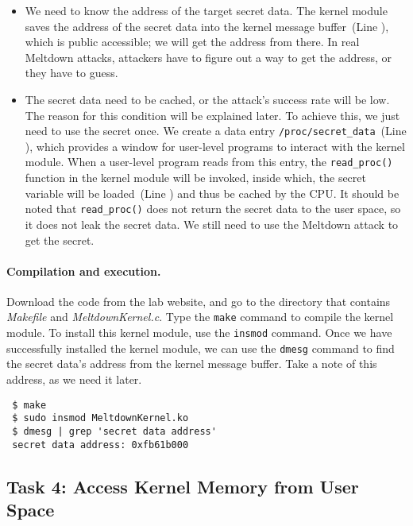 \begin{itemize}
\item We need to know the address of the target secret data. 
The kernel module saves the address of the secret data into the kernel message buffer~(Line
), which is public accessible; we will get the address from there. In real Meltdown
attacks, attackers have to figure out a way to get the address, or they have to guess.


\item The secret data need to be cached, or the attack's success rate will be low. 
The reason for this condition will be explained later. To achieve this, we just need to use the secret once. 
We create a data entry \texttt{/proc/secret\_data}~(Line ), which provides a window
for user-level programs to interact with the kernel module. When a user-level program reads
from this entry, the \texttt{read\_proc()} function in the kernel module will be invoked,
inside which, the secret variable will be loaded~(Line ) and thus be cached by the CPU. 
It should be noted that \texttt{read\_proc()} does not return
the secret data to the user space, so it does not leak the secret data. We still need
to use the Meltdown attack to get the secret.
\end{itemize}


\paragraph{Compilation and execution.}
Download the code from the lab website, and go to the directory that contains 
\textit{Makefile} and \textit{MeltdownKernel.c}. Type the \texttt{make} command
to compile the kernel module. 
To install this kernel module, use the \texttt{insmod} command. 
Once we have successfully installed the kernel module, we can 
use the \texttt{dmesg} command to find the 
secret data's address from the kernel message buffer. Take a note of this address, as we need
it later.

\begin{lstlisting}
 $ make
 $ sudo insmod MeltdownKernel.ko
 $ dmesg | grep 'secret data address'
 secret data address: 0xfb61b000
\end{lstlisting}
 



\subsection{Task 4: Access Kernel Memory from User Space}

